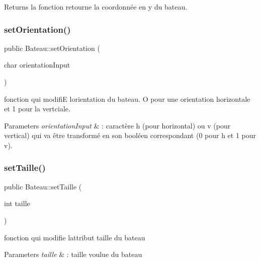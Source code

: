 \begin{DoxyReturn}{Returns}
la fonction retourne la coordonnée en y du bateau. 
\end{DoxyReturn}
\mbox{\label{class_bateau_a0c88ac8759c24674a23b7523cb3f6667}} 
\subsubsection{\texorpdfstring{set\+Orientation()}{setOrientation()}}
{\footnotesize\ttfamily public Bateau\+::set\+Orientation (\begin{DoxyParamCaption}\item[{char}]{orientation\+Input }\end{DoxyParamCaption})}



fonction qui modifiE l\textquotesingle{}orientation du bateau. O pour une orientation horizontale et 1 pour la vertciale. 


\begin{DoxyParams}{Parameters}
{\em orientation\+Input} & \+: caractère h (pour horizontal) ou v (pour vertical) qui va être transformé en son booléen correspondant (0 pour h et 1 pour v). \\
\hline
\end{DoxyParams}
\mbox{\label{class_bateau_ac06303b2d1c9b2c9d6b29e6f65eaff26}} 
\subsubsection{\texorpdfstring{set\+Taille()}{setTaille()}}
{\footnotesize\ttfamily public Bateau\+::set\+Taille (\begin{DoxyParamCaption}\item[{int}]{taille }\end{DoxyParamCaption})}



fonction qui modifie l\textquotesingle{}attribut taille du bateau 


\begin{DoxyParams}{Parameters}
{\em taille} & \+: taille voulue du bateau \\
\hline
\end{DoxyParams}
\mbox{\label{class_bateau_aecf45729913eb0c51a82475b996273ce}} 
